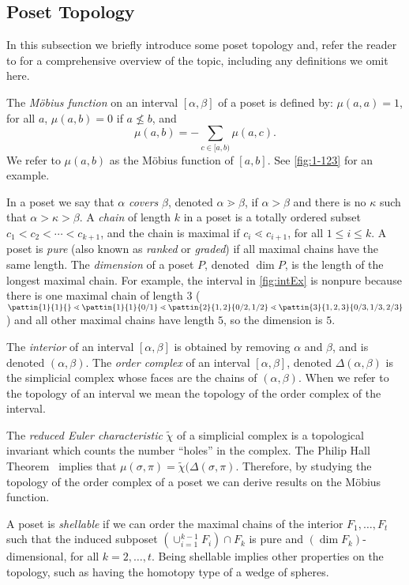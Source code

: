 \documentclass[11pt,a4paper,oneside]{article}
\begin{document}
\subsection{Poset Topology}
In this subsection we briefly introduce some poset topology and, refer the reader to \cite{Wac07}
for a comprehensive overview of the topic, including any definitions we omit here.

The \emph{M\"obius function} on an interval $[\alpha,\beta]$ of a poset is defined by:
$\mu(a,a)=1$, for all $a$, $\mu(a,b)=0$ if $a\not\le b$, and $$\mu(a,b)=-\sum_{c\in[a,b)}\mu(a,c).$$
We refer to $\mu(a,b)$ as the M\"obius function of $[a,b]$. See \cref{fig:1-123} for an example.

In a poset we say that $\alpha$ \emph{covers} $\beta$, denoted $\alpha\gtrdot\beta$, if $\alpha>\beta$
and there is no $\kappa$ such that $\alpha>\kappa>\beta$. A \emph{chain} of length $k$ in a poset is
a totally ordered subset $c_1<c_2<\cdots<c_{k+1}$, and the chain is maximal if $c_i\lessdot c_{i+1}$,
for all $1\le i \le k$. A poset is \emph{pure} (also known as \emph{ranked} or \emph{graded}) if all
maximal chains have the same length. The \emph{dimension} of a poset $P$, denoted $\dim P$, is the
length of the longest maximal chain. For example, the interval in \cref{fig:intEx} is nonpure because
there is one maximal chain of length $3$ ($\pattin{1}{1}{}\lessdot\pattin{1}{1}{0/1}\lessdot
\pattin{2}{1,2}{0/2,1/2}\lessdot\pattin{3}{1,2,3}{0/3,1/3,2/3}$) and all other maximal chains have
length $5$, so the dimension is $5$.

The \emph{interior} of an interval $[\alpha,\beta]$ is obtained by removing $\alpha$ and $\beta$,
and is denoted $(\alpha,\beta)$. The \emph{order complex} of an interval $[\alpha,\beta]$, denoted
$\Delta(\alpha,\beta)$ is the simplicial complex whose faces are the chains of $(\alpha,\beta)$.
When we refer to the topology of an interval we mean the topology of the order complex of the interval.

The \emph{reduced Euler characteristic} $\tilde{\chi}$ of a simplicial complex is a topological invariant
which counts the number ``holes'' in the complex. The Philip Hall Theorem~\cite{Hall36} implies that
$\mu(\sigma,\pi)=\tilde{\chi}(\Delta(\sigma,\pi)$. Therefore, by studying the topology of the order
complex of a poset we can derive results on the M\"obius function.

A poset is \emph{shellable} if we can order the maximal chains of the interior $F_1,\ldots,F_t$
such that the induced subposet $\left(\cup_{i=1}^{k-1}F_i\right)\cap F_k$ is pure and
$(\dim F_k)$-dimensional, for all $k=2,\ldots,t$. Being shellable implies other properties
on the topology, such as having the homotopy type of a wedge of spheres.
\end{document}
